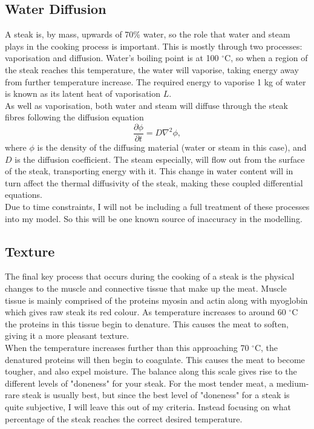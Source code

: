 \documentclass[11pt]{article}
\begin{document}
	\subsection{Water Diffusion}
	
	A steak is, by mass, upwards of 70\% water\cite{water_content}, so the role that water and steam plays in the cooking process is important. This is mostly through two processes: vaporisation and diffusion. Water's boiling point is at 100 $^\circ\text{C}$, so when a region of the steak reaches this temperature, the water will vaporise, taking energy away from further temperature increase. The required energy to vaporise 1 kg of water is known as its latent heat of vaporisation $L$. \\
	
	As well as vaporisation, both water and steam will diffuse through the steak fibres following the diffusion equation\cite{diffusion}
	\begin{equation}
		\frac{\partial \phi}{\partial t} = D\nabla^2 \phi,
	\end{equation}
	where $\phi$ is the density of the diffusing material (water or steam in this case), and $D$ is the diffusion coefficient. The steam especially, will flow out from the surface of the steak, transporting energy with it. This change in water content will in turn affect the thermal diffusivity of the steak, making these coupled differential equations. \\
	
	Due to time constraints, I will not be including a full treatment of these processes into my model. So this will be one known source of inaccuracy in the modelling.
	
	\subsection{Texture}
	
	The final key process that occurs during the cooking of a steak is the physical changes to the muscle and connective tissue that make up the meat. Muscle tissue is mainly comprised of the proteins myosin and actin\cite{myosin} along with myoglobin which gives raw steak its red colour\cite{myoglobin}. As temperature increases to around 60 $^\circ\text{C}$ the proteins in this tissue begin to denature\cite{denature}. This causes the meat to soften, giving it a more pleasant texture. \\
	
	When the temperature increases further than this approaching 70 $^\circ\text{C}$, the denatured proteins will then begin to coagulate. This causes the meat to become tougher, and also expel moisture. The balance along this scale gives rise to the different levels of "doneness" for your steak. For the most tender meat, a medium-rare steak is usually best, but since the best level of "doneness" for a steak is quite subjective, I will leave this out of my criteria. Instead focusing on what percentage of the steak reaches the correct desired temperature.
	
\end{document}
